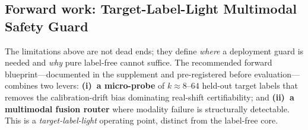 \documentclass[conference]{IEEEtran}
\theoremstyle{plain}
\theoremstyle{definition}
\begin{document}
\begin{table}[t]\centering\footnotesize
\caption{\textbf{ImageNet-R across ten backbones (3 seeds).} Mean regret-to-oracle (lower is
better) for \textsc{KGA}, always-adapt, always-freeze, and pooled false-adapt (FA). No backbone
yields a certified beats-both; \textsc{KGA} never underperforms the better trivial policy and
controls false-adapt at $\alpha{=}0.10$.}
\label{tab:imagenetr-backbones}
\end{table}

\subsection{Forward work: Target-Label-Light Multimodal Safety Guard}\label{sec:forward-tll}
The limitations above are not dead ends; they define \emph{where} a deployment guard is needed and
\emph{why} pure label-free cannot suffice. The recommended forward blueprint---documented in the
supplement and pre-registered before evaluation---combines two levers:
\textbf{(i)~a micro-probe} of $k{\approx}8$--$64$ held-out target labels that removes the
calibration-drift bias dominating real-shift certifiability; and \textbf{(ii)~a multimodal fusion
router} where modality failure is structurally detectable. This is a \emph{target-label-light}
operating point, distinct from the label-free core.
\end{document}
